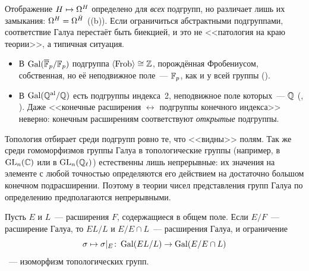 \begin{aside}
Отображение $H\mapsto\Omega^H$ определено для \emph{всех} подгрупп, но различает лишь их замыкания: $\Omega^H=\Omega^{\bar H}$
((b)). Если ограничиться абстрактными подгруппами, соответствие Галуа перестаёт быть биекцией, и это не
<<патология на краю теории>>, а типичная ситуация.
\begin{itemize}[leftmargin=*]
\item В $\operatorname{Gal}(\overline{\mathbb F}_p/\mathbb F_p)$ подгруппа $\langle\operatorname{Frob}\rangle\cong\mathbb Z$, порождённая Фробениусом, собственная, но её
неподвижное поле~--- $\mathbb F_p$, как и у всей группы ().
\item В $\operatorname{Gal}(\mathbb Q^{\mathrm{al}}/\mathbb Q)$ есть подгруппы индекса~2, неподвижное поле которых~--- $\mathbb Q$ (, ). Даже <<конечные расширения
$\leftrightarrow$ подгруппы конечного индекса>> неверно: конечным расширениям соответствуют \emph{открытые} подгруппы.
\end{itemize}
Топология отбирает среди подгрупп ровно те, что <<видны>> полям. Так же среди гомоморфизмов группы Галуа в топологические группы
(например, в $\mathrm{GL}_n(\mathbb C)$ или в $\mathrm{GL}_n(\mathbb Q_\ell)$) естественны лишь непрерывные: их значения на
элементе с любой точностью определяются его действием на достаточно большом конечном подрасширении. Поэтому в теории чисел представления групп Галуа по определению предполагаются непрерывными.
\end{aside}

\begin{proposition}[7.15]
Пусть $E$ и $L$~--- расширения $F$, содержащиеся в общем поле. Если $E/F$~--- расширение Галуа, то $EL/L$ и
$E/E\cap L$~--- расширения Галуа, и ограничение
\[
\sigma\mapsto\sigma|_E\colon\operatorname{Gal}(EL/L)\to\operatorname{Gal}(E/E\cap L)
\]
~--- изоморфизм топологических групп.
\end{proposition}

\begin{center}
\end{center}

